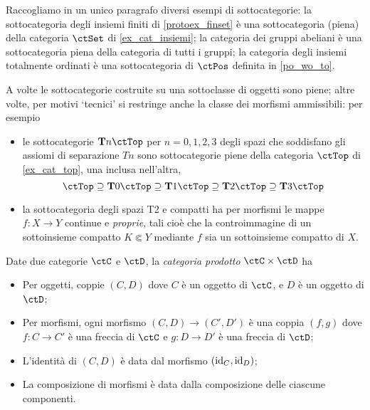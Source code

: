 \begin{example}
	Raccogliamo in un unico paragrafo diversi esempi di sottocategorie: la sottocategoria degli insiemi finiti di \ref{protoex_finset} è una sottocategoria (piena) della categoria \(\ctSet\) di \ref{ex_cat_insiemi}; la categoria dei gruppi abeliani è una sottocategoria piena della categoria di tutti i gruppi; la categoria degli insiemi totalmente ordinati è una sottocategoria di \(\ctPos\) definita in \ref{po_wo_to}.

	A volte le sottocategorie costruite su una sottoclasse di oggetti sono piene; altre volte, per motivi `tecnici' si restringe anche la classe dei morfismi ammissibili: per esempio
	\begin{itemize}
		\item le sottocategorie \(\cate{T}n\ctTop\) per \(n=0,1,2,3\) degli spazi che soddisfano gli assiomi di separazione \(Tn\) sono sottocategorie piene della categoria \(\ctTop\) di \ref{ex_cat_top}, una inclusa nell'altra,
		      \[\ctTop\supseteq\cate{T}0\ctTop\supseteq\cate{T}1\ctTop\supseteq\cate{T}2\ctTop\supseteq\cate{T}3\ctTop\]
		\item la sottocategoria degli spazi T2 e compatti ha per morfismi le mappe \(f : X\to Y\) continue e \emph{proprie}, tali cioè che la controimmagine di un sottoinsieme compatto \(K\Subset Y\) mediante \(f\) sia un sottoinsieme compatto di \(X\).
	\end{itemize}
\end{example}
\begin{definition}\label{def_cat_prodotto}
	Date due categorie \(\ctC\) e \(\ctD\), la \emph{categoria prodotto} \(\ctC\times\ctD\) ha
	\begin{itemize}
		\item Per oggetti, coppie \((C,D)\) dove \(C\) è un oggetto di \(\ctC\), e \(D\) è un oggetto di \(\ctD\);
		\item Per morfismi, ogni morfismo \((C,D)\to(C',D')\) è una coppia \((f,g)\) dove \(f:C\to C'\) è una freccia di \(\ctC\) e \(g:D\to D'\) è una freccia di \(\ctD\);
		\item L'identità di \((C,D)\) è data dal morfismo \((\mathrm{id}_C,\mathrm{id}_D)\);
		\item La composizione di morfismi è data dalla composizione delle ciascune componenti.
	\end{itemize}
\end{definition}
